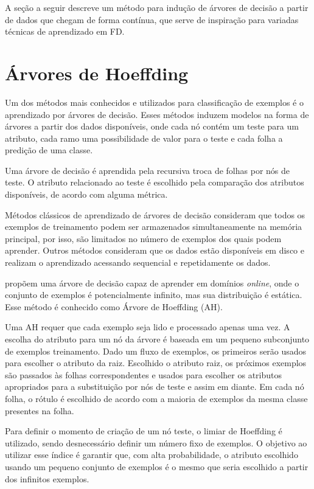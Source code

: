 A seção a seguir descreve um método para indução de árvores de decisão a partir de dados que chegam de forma contínua, que serve de inspiração para variadas técnicas de aprendizado em FD.


\section{Árvores de Hoeffding} \label{chConceitos:FD:HoeffdingTrees}

Um dos métodos mais conhecidos e utilizados para classificação de exemplos é o aprendizado por árvores de decisão. Esses métodos induzem modelos na forma de árvores a partir dos dados disponíveis, onde cada nó contém um teste para um atributo, cada ramo uma possibilidade de valor para o teste e cada folha a predição de uma classe.

Uma árvore de decisão é aprendida pela recursiva troca de folhas por nós de teste. O atributo relacionado ao teste é escolhido pela comparação dos atributos disponíveis, de acordo com alguma métrica.

Métodos clássicos de aprendizado de árvores de decisão \cite{quinlan1986,quinlan1993} consideram que todos os exemplos de treinamento podem ser armazenados simultaneamente na memória principal, por isso, são limitados no número de exemplos dos quais podem aprender. Outros métodos consideram que os dados estão disponíveis em disco e realizam o aprendizado acessando sequencial e repetidamente os dados.

 propõem uma árvore de decisão capaz de aprender em domínios \emph{online}, onde o conjunto de exemplos é potencialmente infinito, mas sua distribuição é estática. Esse método é conhecido como Árvore de Hoeffding (AH).

Uma AH requer que cada exemplo seja lido e processado apenas uma vez. A escolha do atributo para um nó da árvore é baseada em um pequeno subconjunto de exemplos treinamento. Dado um fluxo de exemplos, os primeiros serão usados para escolher o atributo da raiz. Escolhido o atributo raiz, os próximos exemplos são passados às folhas correspondentes e usados para escolher os atributos apropriados para a substituição por nós de teste e assim em diante. Em cada nó folha, o rótulo é escolhido de acordo com a maioria de exemplos da mesma classe presentes na folha.

Para definir o momento de criação de um nó teste, o limiar de Hoeffding \cite{} é utilizado, sendo desnecessário definir um número fixo de exemplos. O objetivo ao utilizar esse índice é garantir que, com alta probabilidade, o atributo escolhido usando um pequeno conjunto de exemplos é o mesmo que seria escolhido a partir dos infinitos exemplos.

